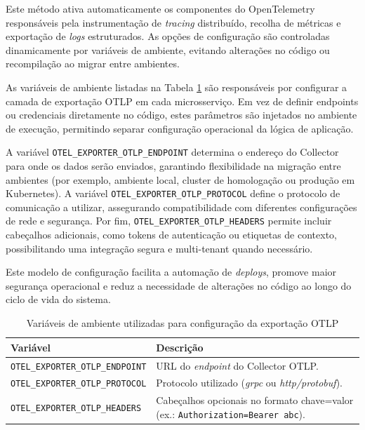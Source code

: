 Este método ativa automaticamente os componentes do OpenTelemetry responsáveis pela instrumentação de \textit{tracing} distribuído, recolha de métricas e exportação de \textit{logs} estruturados. As opções de configuração são controladas dinamicamente por variáveis de ambiente, evitando alterações no código ou recompilação ao migrar entre ambientes.


As variáveis de ambiente listadas na Tabela \ref{tab:otel_env_vars} são responsáveis por configurar a camada de exportação OTLP em cada microsserviço. Em vez de definir endpoints ou credenciais diretamente no código, estes parâmetros são injetados no ambiente de execução, permitindo separar configuração operacional da lógica de aplicação.

A variável \texttt{OTEL\_EXPORTER\_OTLP\_ENDPOINT} determina o endereço do Collector para onde os dados serão enviados, garantindo flexibilidade na migração entre ambientes (por exemplo, ambiente local, cluster de homologação ou produção em Kubernetes). A variável \texttt{OTEL\_EXPORTER\_OTLP\_PROTOCOL} define o protocolo de comunicação a utilizar, assegurando compatibilidade com diferentes configurações de rede e segurança. Por fim, \texttt{OTEL\_EXPORTER\_OTLP\_HEADERS} permite incluir cabeçalhos adicionais, como tokens de autenticação ou etiquetas de contexto, possibilitando uma integração segura e multi-tenant quando necessário.

Este modelo de configuração facilita a automação de \textit{deploys}, promove maior segurança operacional e reduz a necessidade de alterações no código ao longo do ciclo de vida do sistema.


\begin{table}[H]
\centering
\begin{tabular}{|p{6cm}|p{8cm}|}
\hline
\textbf{Variável} & \textbf{Descrição} \\ \hline
\texttt{OTEL\_EXPORTER\_OTLP\_ENDPOINT} & URL do \textit{endpoint} do Collector OTLP. \\ \hline
\texttt{OTEL\_EXPORTER\_OTLP\_PROTOCOL} & Protocolo utilizado (\textit{grpc} ou \textit{http/protobuf}). \\ \hline
\texttt{OTEL\_EXPORTER\_OTLP\_HEADERS} & Cabeçalhos opcionais no formato chave=valor (ex.: \texttt{Authorization=Bearer abc}). \\ \hline
\end{tabular}
\caption{Variáveis de ambiente utilizadas para configuração da exportação OTLP}
\label{tab:otel_env_vars}
\end{table}

